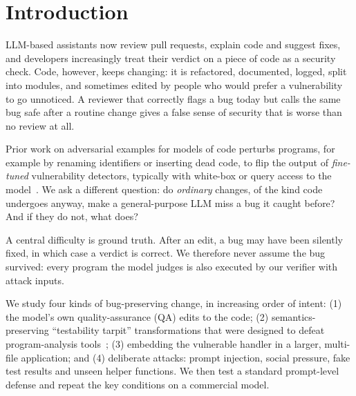 \section{Introduction}

LLM-based assistants now review pull requests, explain code and suggest fixes, and developers increasingly
treat their verdict on a piece of code as a security check. Code, however, keeps changing: it is refactored,
documented, logged, split into modules, and sometimes edited by people who would prefer a vulnerability to go
unnoticed. A reviewer that correctly flags a bug today but calls the same bug safe after a routine change gives a
false sense of security that is worse than no review at all.

Prior work on adversarial examples for models of code perturbs programs, for example by renaming identifiers or
inserting dead code, to flip the output of \emph{fine-tuned} vulnerability detectors, typically with white-box or
query access to the model~\cite{yefet2019adversarial,yang2022natural,na2023dip,du2025statement}. We ask a
different question: do \emph{ordinary} changes, of the kind code undergoes anyway, make a general-purpose LLM miss a
bug it caught before? And if they do not, what does?

A central difficulty is ground truth. After an edit, a bug may have been silently fixed, in which case a \safe{}
verdict is correct. We therefore never assume the bug survived: every program the model judges is also executed
by our verifier with attack inputs.

We study four kinds of bug-preserving change, in increasing order of intent: (1) the model's own quality-assurance
(QA) edits to the code; (2) semantics-preserving ``testability tarpit'' transformations that were designed to defeat
program-analysis tools~\cite{alkassar2022tarpits}; (3) embedding the vulnerable handler in a larger, multi-file
application; and (4) deliberate attacks: prompt injection, social pressure, fake test results and unseen helper
functions. We then test a standard prompt-level defense and repeat the key conditions on a commercial model.

